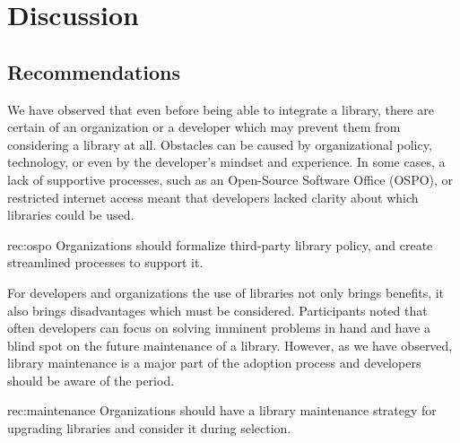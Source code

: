\section{Discussion} 

\subsection{Recommendations}

We have observed that even before being able to integrate a library, there are certain   of an organization or a developer which may prevent them from considering a library at all. Obstacles can be caused by organizational policy, technology, or even by the developer's mindset and experience. In some cases, a lack of supportive processes, such as an Open-Source Software Office (OSPO), or restricted internet access meant that developers lacked clarity about which libraries could be used. 
\begin{recommendation}{rec:ospo}
  {Organizations should formalize 
third-party library policy, and create streamlined processes to support it.}
\end{recommendation}\medskip

For developers and organizations the use of libraries not only brings benefits, it also brings disadvantages which must be considered. Participants noted that often developers can focus on solving imminent problems in hand and have a blind spot on the future maintenance of a library. However, as we have observed, library maintenance is a major part of the adoption process and developers should be aware of the  period. 
\begin{recommendation}{rec:maintenance}
  {Organizations should have a library maintenance strategy for upgrading libraries and consider it during selection.}
\end{recommendation}\medskip

